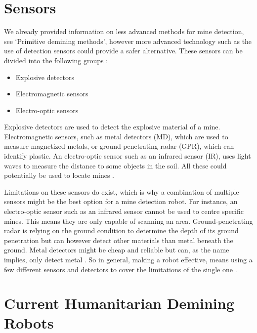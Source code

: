 \section{Sensors}

We already provided information on less advanced methods for mine detection, see ‘Primitive demining methods’, however more advanced technology such as the use of detection sensors could provide a safer alternative. These sensors can be divided into the following groups \cite{HumanitarianDemining2017}:
\begin{itemize}
\setlength{\itemsep}{0.05\baselineskip}
	\item Explosive detectors
	\item Electromagnetic sensors
	\item Electro-optic sensors
\end{itemize}

Explosive detectors are used to detect the explosive material of a mine. Electromagnetic sensors, such as metal detectors (MD), which are used to measure magnetized metals, or ground penetrating radar (GPR), which can identify plastic. An electro-optic sensor such as an infrared sensor (IR), uses light waves to measure the distance to some objects in the soil. All these could potentially be used to locate mines \cite{HumanitarianDemining2017}.

Limitations on these sensors do exist, which is why a combination of multiple sensors might be the best option for a mine detection robot. For instance, an electro-optic sensor such as an infrared sensor cannot be used to centre specific mines. This means they are only capable of scanning an area. Ground-penetrating radar is relying on the ground condition to determine the depth of its ground penetration but can however detect other materials than metal beneath the ground. Metal detectors might be cheap and reliable but can, as the name implies, only detect metal \cite{HumanitarianDemining2017}.
So in general, making a robot effective, means using a few different sensors and detectors to cover the limitations of the single one \cite{6LeggedRobot2007}.

\section{Current Humanitarian Demining Robots}


